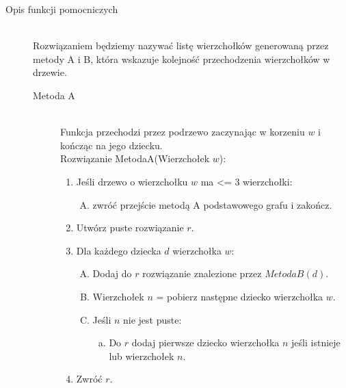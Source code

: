 \begin{description}
	\item[Opis funkcji pomocniczych] \hfill \\
	Rozwiązaniem będziemy nazywać listę wierzchołków generowaną przez metody A i B, która wskazuje kolejność przechodzenia wierzchołków w drzewie.
	\begin{description}
	\item[Metoda A] \hfill \\ 
	 Funkcja przechodzi przez podrzewo zaczynając w korzeniu $w$ i kończąc na jego dziecku.\\
	 Rozwiązanie MetodaA(Wierzchołek $w$):
	\begin{enumerate}[1.]
		\item Jeśli drzewo o wierzchołku $w$ ma <= 3 wierzchołki:
				\begin{enumerate}[A.]
				\item zwróć przejście metodą A podstawowego grafu i zakończ.
				\end{enumerate}
		\item Utwórz puste rozwiązanie $r$.
		\item Dla każdego dziecka $d$ wierzchołka $w$:
			\begin{enumerate}[A.]
			\item Dodaj do $r$ rozwiązanie znalezione przez $MetodaB(d)$.
			\item Wierzchołek $n$ = pobierz następne dziecko wierzchołka $w$.
			\item Jeśli $n$ nie jest puste:
				\begin{enumerate}[a.]
				\item Do $r$ dodaj pierwsze dziecko wierzchołka $n$ jeśli istnieje lub wierzchołek $n$.
				\end{enumerate}
			\end{enumerate}
		\item Zwróć $r$.
	\end{enumerate}
	

\end{description}
\end{description}
